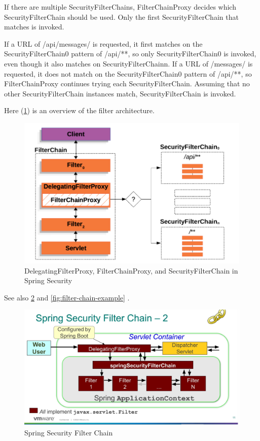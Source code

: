\documentclass{scrartcl}
\begin{document}
If there are multiple SecurityFilterChains, FilterChainProxy decides which SecurityFilterChain should be used. Only the first SecurityFilterChain that matches is invoked.

If a URL of /api/messages/ is requested, it first matches on the SecurityFilterChain0 pattern of /api/**, so only SecurityFilterChain0 is invoked, even though it also matches on SecurityFilterChainn. If a URL of /messages/ is requested, it does not match on the SecurityFilterChain0 pattern of /api/**, so FilterChainProxy continues trying each SecurityFilterChain. Assuming that no other SecurityFilterChain instances match, SecurityFilterChain is invoked.

Here (\ref{fig:filters}) is an overview of the filter architecture.

\begin{figure}[h!]
    \centering
    \includegraphics[width=1\linewidth]{filters}
    \caption{DelegatingFilterProxy, FilterChainProxy, and SecurityFilterChain in Spring Security }
    \label{fig:filters}
\end{figure}

See also \ref{fig:filter-chain} and \ref{fig:filter-chain-example}
.
\begin{figure}[h]
    \centering
    \includegraphics[width=1\linewidth]{filter-chain}
    \caption{Spring Security Filter Chain}
    \label{fig:filter-chain}
\end{figure}
\end{document}
